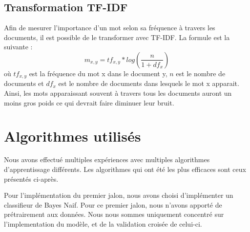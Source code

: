 \documentclass{article}
\begin{document}
\subsection{Transformation TF-IDF}
Afin de mesurer l'importance d'un mot selon sa fréquence à travers les documents, il est possible de le transformer avec TF-IDF. La formule est la suivante :
\[m_{x,y} = {tf}_{x,y} * log(\frac{n}{1 + df_x})\]
où $tf_{x,y}$ est la fréquence du mot x dans le document y, $n$ est le nombre de documents et $df_x$ est le nombre de documents dans lesquels le mot x apparait.\\
Ainsi, les mots apparaissant souvent à travers tous les documents auront un moins gros poids ce qui devrait faire diminuer leur bruit.

\section{Algorithmes utilisés}
Nous avons effectué multiples expériences avec multiples algorithmes d'apprentissage différents. Les algorithmes qui ont été les plus efficaces sont ceux présentés ci-après.

Pour l'implémentation du premier jalon, nous avons choisi d'implémenter un classifieur de Bayes Naif. Pour ce premier jalon, nous n'avons apporté de prétrairement aux données. Nous nous sommes uniquement concentré sur l'implementation du modèle, et de la validation croisée de celui-ci.
\end{document}
